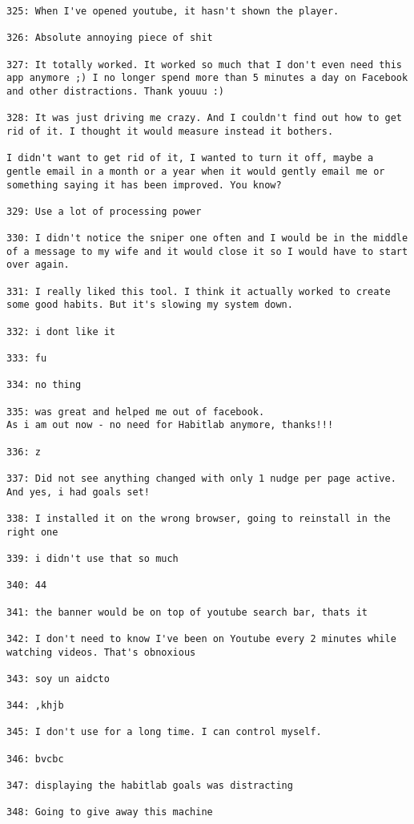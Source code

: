 \begin{lstlisting}[breaklines]
325: When I've opened youtube, it hasn't shown the player.

326: Absolute annoying piece of shit

327: It totally worked. It worked so much that I don't even need this app anymore ;) I no longer spend more than 5 minutes a day on Facebook and other distractions. Thank youuu :)

328: It was just driving me crazy. And I couldn't find out how to get rid of it. I thought it would measure instead it bothers. 

I didn't want to get rid of it, I wanted to turn it off, maybe a gentle email in a month or a year when it would gently email me or something saying it has been improved. You know?

329: Use a lot of processing power

330: I didn't notice the sniper one often and I would be in the middle of a message to my wife and it would close it so I would have to start over again.

331: I really liked this tool. I think it actually worked to create some good habits. But it's slowing my system down.

332: i dont like it

333: fu

334: no thing

335: was great and helped me out of facebook.
As i am out now - no need for Habitlab anymore, thanks!!!

336: z

337: Did not see anything changed with only 1 nudge per page active. And yes, i had goals set!

338: I installed it on the wrong browser, going to reinstall in the right one

339: i didn't use that so much

340: 44

341: the banner would be on top of youtube search bar, thats it

342: I don't need to know I've been on Youtube every 2 minutes while watching videos. That's obnoxious

343: soy un aidcto

344: ,khjb

345: I don't use for a long time. I can control myself.

346: bvcbc

347: displaying the habitlab goals was distracting

348: Going to give away this machine


\end{lstlisting}
